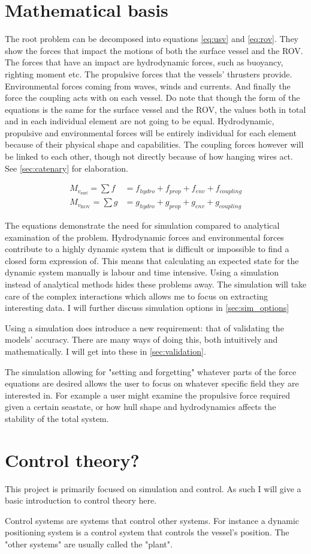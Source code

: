 \section{Mathematical basis}
The root problem can be decomposed into equations \ref{eq:usv} and \ref{eq:rov}. They show the forces that impact the motions of both the surface vessel and the ROV. The forces that have an impact are hydrodynamic forces, such as buoyancy, righting moment etc. The propulsive forces that the vessels' thrusters provide. Environmental forces coming from waves, winds and currents. And finally the force the coupling acts with on each vessel. Do note that though the form of the equations is the same for the surface vessel and the ROV, the values both in total and in each individual element are not going to be equal. Hydrodynamic, propulsive and environmental forces will be entirely individual for each element because of their physical shape and capabilities. The coupling forces however will be linked to each other, though not directly because of how hanging wires act. See \cref{sec:catenary} for elaboration.

\begin{align}
M_{v_{\text{surf}}} = \sum f &= f_{hydro} + f_{prop} + f_{env} + f_ {coupling} \label{eq:usv}\\
M_{v_{\text{ROV}}} = \sum g &= g_{hydro} + g_{prop} + g_{env} + g_ {coupling} \label{eq:rov}
\end{align}

The equations demonstrate the need for simulation compared to analytical examination of the problem. Hydrodynamic forces and environmental forces contribute to a highly dynamic system that is difficult or impossible to find a closed form expression of. This means that calculating an expected state for the dynamic system manually is labour and time intensive. Using a simulation instead of analytical methods hides these problems away. The simulation will take care of the complex interactions which allows me to focus on extracting interesting data. I will further discuss simulation options in \cref{sec:sim_options}

Using a simulation does introduce a new requirement: that of validating the models' accuracy. There are many ways of doing this, both intuitively and mathematically. I will get into these in \cref{sec:validation}. 

The simulation allowing for "setting and forgetting" whatever parts of the force equations are desired allows the user to focus on whatever specific field they are interested in. For example a user might examine the propulsive force required given a certain seastate, or how hull shape and hydrodynamics affects the stability of the total system. 

\section{Control theory?}
This project is primarily focused on simulation and control. As such I will give a basic introduction to control theory here. 

Control systems are systems that control other systems. For instance a dynamic positioning system is a control system that controls the vessel's position. The "other systems" are usually called the "plant". 